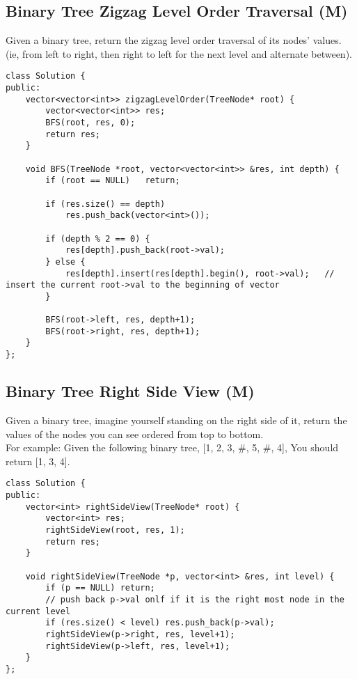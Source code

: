 \subsection{Binary Tree Zigzag Level Order Traversal (M)}
Given a binary tree, return the zigzag level order traversal of its nodes' values. (ie, from left to right, then right to left for the next level and alternate between).\\

\begin{lstlisting}
class Solution {
public:
    vector<vector<int>> zigzagLevelOrder(TreeNode* root) {
        vector<vector<int>> res;
        BFS(root, res, 0);
        return res;
    }
    
    void BFS(TreeNode *root, vector<vector<int>> &res, int depth) {
        if (root == NULL)   return;
        
        if (res.size() == depth)
            res.push_back(vector<int>());  

        if (depth % 2 == 0) {                                   
            res[depth].push_back(root->val);
        } else {                                                
            res[depth].insert(res[depth].begin(), root->val);   // insert the current root->val to the beginning of vector
        }
        
        BFS(root->left, res, depth+1);  
        BFS(root->right, res, depth+1);
    }
};
\end{lstlisting}


\subsection{Binary Tree Right Side View (M)}
Given a binary tree, imagine yourself standing on the right side of it, return the values of the nodes you can see ordered from top to bottom. \\

For example: Given the following binary tree, [1, 2, 3, \#, 5, \#, 4], You should return [1, 3, 4]. \\

\begin{lstlisting}
class Solution {
public:
    vector<int> rightSideView(TreeNode* root) {
        vector<int> res;
        rightSideView(root, res, 1);
        return res;
    }
    
    void rightSideView(TreeNode *p, vector<int> &res, int level) {
        if (p == NULL) return;
        // push back p->val onlf if it is the right most node in the current level
        if (res.size() < level) res.push_back(p->val);
        rightSideView(p->right, res, level+1);
        rightSideView(p->left, res, level+1);
    }
};
\end{lstlisting}


